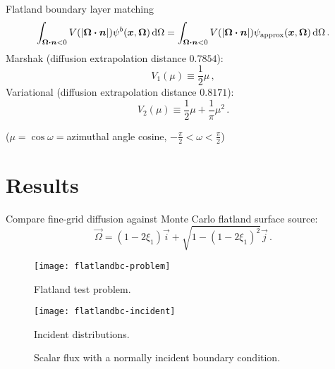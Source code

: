 \documentclass{beamer}
\begin{document}
\begin{frame}{Flatland boundary layer matching}
\begin{equation*}
\int_{\bm{\Omega}\bm{\cdot}\bm{n} < 0} V( \left| \bm{\Omega}\bm{\cdot}\bm{n} \right|)
\psi^b(\bm{x}, \bm{\Omega}) \mathop{}\!\mathrm{d}\Omega
=
\int_{\bm{\Omega}\bm{\cdot}\bm{n} < 0} V( \left| \bm{\Omega}\bm{\cdot}\bm{n} \right|)
\psi_\text{approx}(\bm{x}, \bm{\Omega}) \mathop{}\!\mathrm{d}\Omega \,.
\end{equation*}
Marshak (diffusion extrapolation distance $0.7854$):
\begin{equation*}
  V_1(\mu) \equiv \frac{1}{2} \mu \,,
\end{equation*}
Variational (diffusion extrapolation distance $0.8171$):
\begin{equation*}
  V_2(\mu) \equiv \frac{1}{2} \mu + \frac{1}{\pi}\mu^2 \,.
\end{equation*}

($\mu=\cos\omega={}$azimuthal angle cosine, $-\frac{\pi}{2} < \omega <
\frac{\pi}{2}$)
\end{frame}

\section{Results}
\begin{frame}
Compare fine-grid diffusion against Monte Carlo flatland surface source:
\begin{equation*}
  \vec{\Omega} = (1 - 2\xi_1) \vec{i} + \sqrt{1 - (1 - 2\xi_1)^2} \vec{j}\,.
\end{equation*}

\begin{figure}[tb]
  \texttt{[image: flatlandbc-problem]}

  \caption{Flatland test problem.}
  \label{fig:problem}
\end{figure}

\begin{figure}[tb]
  \centering\vspace{-.5in}%
  \texttt{[image: flatlandbc-incident]}

  \caption{Incident distributions.}
  \label{fig:distributions}
\end{figure}

\end{frame}

\begin{frame}
\begin{figure}[tb]
  \centering
  \hspace{-.5in}
  
  \hspace{-.5in}
  \caption{Scalar flux with a normally incident boundary condition.}
  \label{fig:delta}
\end{figure}
\end{frame}
\end{document}
